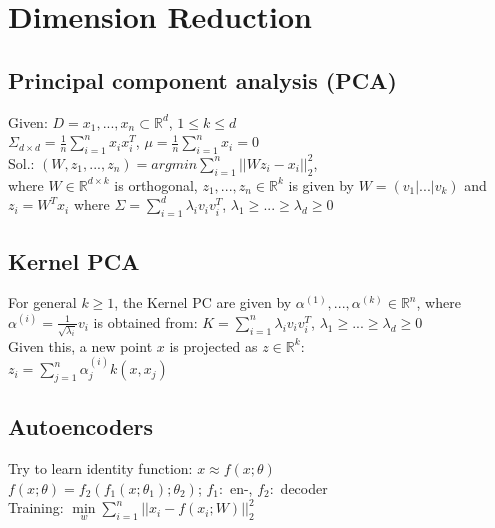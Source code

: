 \section*{Dimension Reduction}
\subsection*{Principal component analysis (PCA)}
Given: $D={x_1,...,x_n} \subset \mathbb{R}^d$, $1\leq k \leq d$\\
$\Sigma_{d \times d} = \frac{1}{n}\sum_{i=1}^n x_i x_i^T$, $\mu =\frac{1}{n}\sum_{i = 1}^n x_i = 0$\\
Sol.:
$(W,z_1,...,z_n) = argmin \sum_{i=1}^n||W z_i - x_i||_2^2$,\\
where $W \in \mathbb{R}^{d \times k}$ is orthogonal, $z_1,...,z_n\in\mathbb{R}^k$ is given by $W = (v_1|...|v_k)$ and $z_i = W^T x_i$ where $\Sigma = \sum_{i=1}^d \lambda_i v_i v_i^T$, $\lambda_1 \geq ... \geq \lambda_d \geq 0$

\subsection*{Kernel PCA}
For general $k\geq1$, the Kernel PC are given by $\alpha^{(1)},...,\alpha^{(k)}\in \mathbb{R}^n$, where $\alpha^{(i)} = \frac{1}{\sqrt{\lambda_i}}v_i$ is obtained from: $K = \sum_{i=1}^n \lambda_i v_i v_i^T$, $\lambda_1 \geq ... \geq \lambda_d \geq 0$\\
Given this, a new point $x$ is projected as $z \in \mathbb{R}^k$:\\
$z_i = \sum_{j=1}^n\alpha_j^{(i)}k(x,x_j)$

\subsection*{Autoencoders}
Try to learn identity function: $x \approx f(x;\theta)$\\
$f(x;\theta) = f_2(f_1(x;\theta_1);\theta_2)$; $f_1:$ en-, $f_2:$ decoder\\
Training: $ \underset{w}{\operatorname{min}}\sum_{i=1}^n||x_i-f(x_i;W)||_2^2$